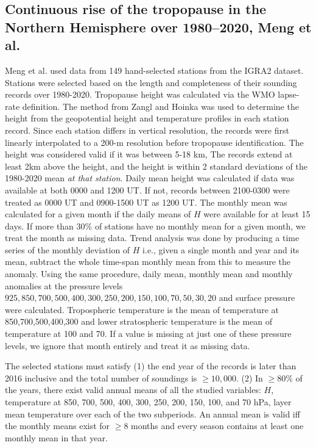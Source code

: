 \documentclass[fleqn,10pt]{wlscirep}
\begin{document}
\subsection*{Continuous rise of the tropopause in the Northern Hemisphere over 1980–2020, Meng et al. \cite{meng2021continuous}}
Meng et al. \cite{meng2021continuous} used data from 149 hand-selected stations from the IGRA2 dataset. Stations were selected based on the length and completeness of their sounding records over 1980-2020. Tropopause height was calculated via the WMO lapse-rate definition. The method from Zangl and Hoinka \cite{zangl2001tropopause} was used to determine the height from the geopotential height and temperature profiles in each station record. Since each station differs in vertical resolution, the records were first linearly interpolated to a 200-m resolution before tropopause identification. The height was considered valid if it was between 5-18 km, The records extend at least 2km above the height, and the height is within 2 standard deviations of the 1980-2020 mean \textit{at that station}. Daily mean height was calculated if data was available at both 0000 and 1200 UT. If not, records between 2100-0300 were treated as 0000 UT and 0900-1500 UT as 1200 UT. The monthly mean was calculated for a given month if the daily means of $H$ were available for at least 15 days. If more than 30\% of stations have no monthly mean for a given month, we treat the month as missing data. Trend analysis was done by producing a time series of the monthly deviation of $H$ i.e., given a single month and year and its mean, subtract the whole time-span monthly mean from this to measure the anomaly. Using the same procedure, daily mean, monthly mean and monthly anomalies at the pressure levels $925, 850, 700, 500, 400, 300, 250, 200, 150, 100, 70, 50, 30, 20$ and surface pressure were calculated. Tropospheric temperature is the mean of temperature at 850,700,500,400,300 and lower stratospheric temperature is the mean of temperature at 100 and 70. If a value is missing at just one of these pressure levels, we ignore that month entirely and treat it as missing data. 

The selected stations must satisfy (1) the end year of the records is later than 2016 inclusive and the total number of soundings is $\geq 10,000$. (2) In $\geq 80\%$ of the years, there exist valid annual means of all the studied variables: $H$, temperature at 850, 700, 500, 400, 300, 250, 200, 150, 100, and 70 hPa, layer mean temperature over each of the two subperiods. An annual mean is valid iff the monthly means exist for $\geq 8$ months and every season contains at least one monthly mean in that year. 
\end{document}
